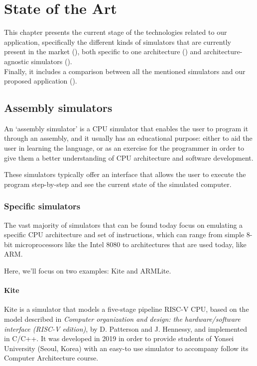 \chapter{State of the Art}\label{chap:state-of-the-art}
This chapter presents the current stage of the technologies related to our application, specifically the different kinds of simulators that are currently present in the market (), both specific to one architecture () and architecture-agnostic simulators ().\\
Finally, it includes a comparison between all the mentioned simulators and our proposed application ().



\section{Assembly simulators}\label{sec:assembly-simulators}
An `\gls{assembly simulator}' is a CPU simulator that enables the user to program it through an \gls{assembly}, and it usually has an educational purpose: either to aid the user in learning the language, or as an exercise for the programmer in order to give them a better understanding of CPU architecture and software development.

These simulators typically offer an interface that allows the user to execute the program step-by-step and see the current state of the simulated \gls{computer}.


\subsection{Specific simulators}\label{subsec:specific-assembly-simulators}
The vast majority of simulators that can be found today focus on emulating a specific CPU architecture and set of instructions, which can range from simple 8-bit microprocessors like the Intel 8080\supercite{i8080emulator} to architectures that are used today, like \gls{ARM}\supercite{QtARMSim}.

\noindent
Here, we'll focus on two examples: Kite\supercite{song_kite2019} and ARMLite\supercite{ARMLite}.


\subsubsection*{Kite}  %
Kite\supercite{song_kite2019} is a simulator that models a five-stage \gls{pipeline} \gls{RISC-V} CPU, based on the model described in \textit{Computer organization and design: the hardware/software interface (RISC-V edition)}\supercite{PattersonDavidA.2018Coad}, by D. Patterson and J. Hennessy, and implemented in C/C++. It was developed in 2019 in order to provide students of Yonsei University (Seoul, Korea) with an easy-to use simulator to accompany follow its Computer Architecture course.

